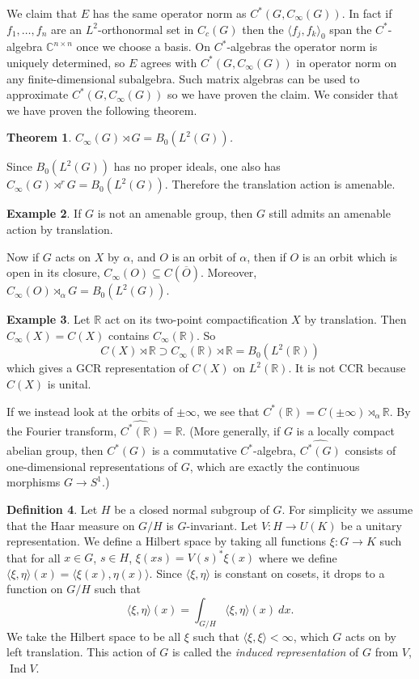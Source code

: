 \documentclass[12pt]{report}
\newcommand{\RR}{\mathbb{R}}
\newcommand{\CC}{\mathbb{C}}
\newcommand{\Ind}{\operatorname{Ind}}
\newcommand{\dfn}[1]{\emph{#1}\index{#1}}
\newtheorem{theorem}{Theorem}[chapter]
\theoremstyle{definition}
\newtheorem{definition}[theorem]{Definition}
\newtheorem{example}[theorem]{Example}
\begin{document}
    We claim that $E$ has the same operator norm as $C^*(G, C_\infty(G))$. In fact if $f_1, \dots, f_n$ are an $L^2$-orthonormal set in $C_c(G)$ then the $\langle f_j, f_k\rangle_0$ span the $C^*$-algebra $\CC^{n \times n}$ once we choose a basis. On $C^*$-algebras the operator norm is uniquely determined, so $E$ agrees with $C^*(G, C_\infty(G))$ in operator norm on any finite-dimensional subalgebra. Such matrix algebras can be used to approximate $C^*(G, C_\infty(G))$ so we have proven the claim. We consider that we have proven the following theorem.
\begin{theorem}
    $C_\infty(G) \rtimes G = B_0(L^2(G))$.
\end{theorem}
    Since $B_0(L^2(G))$ has no proper ideals, one also has $C_\infty(G) \rtimes^r G = B_0(L^2(G))$. Therefore the translation action is amenable.
\begin{example}
    If $G$ is not an amenable group, then $G$ still admits an amenable action by translation.
\end{example}
    Now if $G$ acts on $X$ by $\alpha$, and $O$ is an orbit of $\alpha$, then if $O$ is an orbit which is open in its closure, $C_\infty(O) \subseteq C(\overline O)$. Moreover, $C_\infty(O) \rtimes_\alpha G = B_0(L^2(G))$.
\begin{example}
    Let $\RR$ act on its two-point compactification $X$ by translation. Then $C_\infty(X) = C(X)$ contains $C_\infty(\RR)$. So
    $$C(X) \rtimes \RR \supset C_\infty(\RR) \rtimes \RR = B_0(L^2(\RR))$$
    which gives a GCR representation of $C(X)$ on $L^2(\RR)$. It is not CCR because $C(X)$ is unital.

    If we instead look at the orbits of $\pm \infty$, we see that $C^*(\RR) = C(\pm\infty) \rtimes_\alpha \RR$. By the Fourier transform, $\widehat{C^*(\RR)} = \RR$. (More generally, if $G$ is a locally compact abelian group, then $C^*(G)$ is a commutative $C^*$-algebra, $\widehat{C^*(G)}$ consists of one-dimensional representations of $G$, which are exactly the continuous morphisms $G \to S^1$.)
\end{example}
\begin{definition}
    Let $H$ be a closed normal subgroup of $G$. For simplicity we assume that the Haar measure on $G/H$ is $G$-invariant. Let $V: H \to U(K)$ be a unitary representation. We define a Hilbert space by taking all functions $\xi: G \to K$ such that for all $x \in G$, $s \in H$, $\xi(xs) = V(s)^* \xi(x)$ where we define $\langle \xi, \eta\rangle(x) = \langle \xi(x), \eta(x)\rangle$. Since $\langle \xi, \eta\rangle$ is constant on cosets, it drops to a function on $G/H$ such that
    $$\langle \xi, \eta\rangle(x) = \int_{G/H} \langle \xi, \eta\rangle(x) ~dx.$$
    We take the Hilbert space to be all $\xi$ such that $\langle \xi, \xi\rangle < \infty$, which $G$ acts on by left translation. This action of $G$ is called the \dfn{induced representation} of $G$ from $V$, $\Ind V$.
\end{definition}
\end{document}
